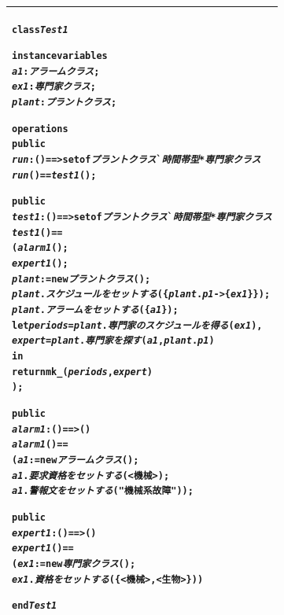 \documentclass[\pformat,12pt,twoside]{jarticle}
\newenvironment{VDMgray}%
{\begin{tabular}{|G|}\hline\small\begin{alltt}}%
{\end{alltt}\normalsize\\
 \hline\end{tabular}}
\begin{document}
\begin{VDMgray}
\textbf{class} \textit{Test1}

\textbf{instance} \textbf{variables}
 \textit{a1} : \textit{アラームクラス};
 \textit{ex1} : \textit{専門家クラス};
 \textit{plant} : \textit{プラントクラス};

\textbf{operations}
 \textbf{public}
 \textit{run}: () ==\texttt{>} \textbf{set} \textbf{of} \textit{プラントクラス}\`{}\textit{時間帯型} * \textit{専門家クラス}
 \textit{run}() == \textit{test1}();

 \textbf{public}
 \textit{test1}: () ==\texttt{>} \textbf{set} \textbf{of} \textit{プラントクラス}\`{}\textit{時間帯型} * \textit{専門家クラス}
 \textit{test1}() ==
   (\textit{alarm1}();
    \textit{expert1}();
    \textit{plant}:= \textbf{new} \textit{プラントクラス}();
    \textit{plant}.\textit{スケジュールをセットする}(\{\textit{plant}.\textit{p1} {\textbar}-\texttt{>} \{\textit{ex1}\}\});
    \textit{plant}.\textit{アラームをセットする}(\{\textit{a1}\});
    \textbf{let} \textit{periods} = \textit{plant}.\textit{専門家のスケジュールを得る}(\textit{ex1}),
        \textit{expert} = \textit{plant}.\textit{専門家を探す}(\textit{a1},\textit{plant}.\textit{p1})
    \textbf{in}
      \textbf{return} \textbf{mk\_}(\textit{periods},\textit{expert})
  );

 \textbf{public}
 \textit{alarm1}: () ==\texttt{>} ()
 \textit{alarm1}() ==
   (\textit{a1}:= \textbf{new} \textit{アラームクラス}();
    \textit{a1}.\textit{要求資格をセットする}(\texttt{<}機械\texttt{>});
    \textit{a1}.\textit{警報文をセットする}("機械系故障"));

 \textbf{public}
 \textit{expert1}: () ==\texttt{>} ()
 \textit{expert1}() ==
   (\textit{ex1}:= \textbf{new} \textit{専門家クラス}();
    \textit{ex1}.\textit{資格をセットする}(\{\texttt{<}機械\texttt{>},\texttt{<}生物\texttt{>}\}))

\textbf{end} \textit{Test1}

\end{VDMgray}
\end{document}
